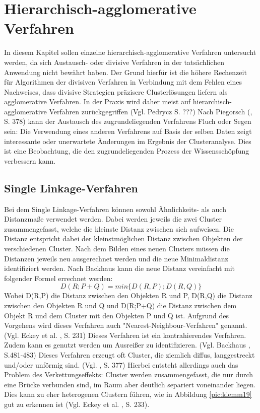\chapter{Hierarchisch-agglomerative Verfahren}

In diesem Kapitel sollen einzelne hierarchisch-agglomerative Verfahren untersucht werden, da sich Austausch- oder divisive Verfahren in der tatsächlichen Anwendung nicht bewährt haben. Der Grund hierfür ist die höhere Rechenzeit für Algorithmen der divisiven Verfahren in Verbindung mit dem Fehlen eines Nachweises, dass divisive Strategien präzisere Clusterlösungen liefern als agglomerative Verfahren. In der Praxis wird daher meist auf hierarchisch-agglomerative Verfahren zurückgegriffen (Vgl. Pedrycz \cite{Pedrycz.2010} S. ???)
Nach Piegorsch (\cite{Piegorsch.2015}, S. 378) kann der Austausch des zugrundeliegenden Verfahrens Fluch oder Segen sein: Die Verwendung eines anderen Verfahrens auf Basis der selben Daten zeigt interessante oder unerwartete Änderungen im Ergebnis der Clusteranalyse. Dies ist eine Beobachtung, die den zugrundeliegenden Prozess der Wissensschöpfung verbessern kann.

\section{Single Linkage-Verfahren}
Bei dem Single Linkage-Verfahren können sowohl Ähnlichkeits- als auch Distanzmaße verwendet werden. Dabei werden jeweils die zwei Cluster zusammengefasst, welche die kleinste Distanz zwischen sich aufweisen. Die Distanz entspricht dabei der kleinstmöglichen Distanz zwischen Objekten der verschiedenen Cluster. Nach dem Bilden eines neuen Clusters müssen die Distanzen jeweils neu ausgerechnet werden und die neue Minimaldistanz identifiziert werden.
Nach Backhaus \cite{Backhaus.2016} kann die neue Distanz vereinfacht mit folgender Formel errechnet werden:
\begin{equation}
	D(R;P+Q) = min\{D(R,P);D(R,Q)\}
\end{equation}
Wobei D(R,P) die Distanz zwischen den Objekten R und P, D(R,Q) die Distanz zwischen den Objekten R und Q und D(R;P+Q) die Distanz zwischen dem Objekt R und dem Cluster mit den Objekten P und Q ist.
Aufgrund des Vorgehens wird dieses Verfahren auch "Nearest-Neighbour-Verfahren" genannt. (Vgl. Eckey et al. \cite{Eckey.2002}, S. 231)
Dieses Verfahren ist ein kontrahierendes Verfahren. Zudem kann es genutzt werden um Ausreißer zu identifizieren. (Vgl. Backhaus \cite{Backhaus.2016}, S.481-483)
Dieses Verfahren erzeugt oft Cluster, die ziemlich diffus, langgestreckt und/oder unförmig sind. (Vgl. \cite{Piegorsch.2015}, S. 377)
Hierbei entsteht allerdings auch das Problem des Verkettungseffekts: Cluster werden zusammengefasst, die nur durch eine Brücke verbunden sind, im Raum aber deutlich separiert voneinander liegen. Dies kann zu eher heterogenen Clustern führen, wie in Abbildung \ref{pic:klemm19} gut zu erkennen ist (Vgl. Eckey et al. \cite{Eckey.2002}, S. 233). 

